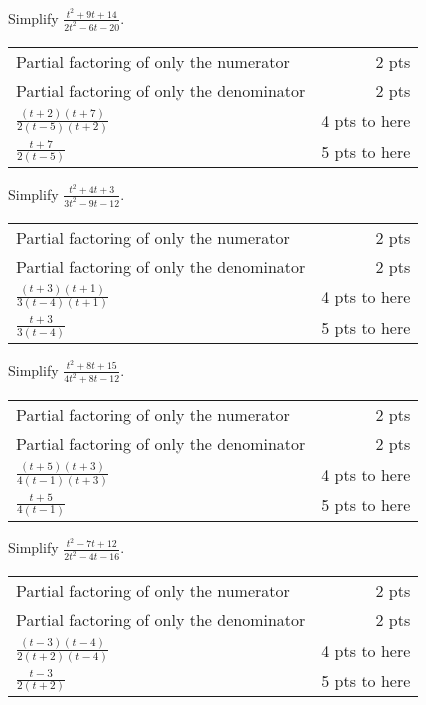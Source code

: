 {
	Simplify $\displaystyle \frac{t^2+9t+14}{2t^2-6t-20}$.
}
{
	\begin{tabular}{l r}
	Partial factoring of only the numerator & 2 pts\\
	Partial factoring of only the denominator & 2 pts\\
	$\displaystyle \frac{(t+2)(t+7)}{2(t-5)(t+2)}$ & 4 pts to here\\[10pt]
	$\displaystyle \frac{t+7}{2(t-5)}$ & 5 pts to here\\
	\end{tabular}
}

{
	Simplify $\displaystyle \frac{t^2+4t+3}{3t^2-9t-12}$.
}
{
	\begin{tabular}{l r}
	Partial factoring of only the numerator & 2 pts\\
	Partial factoring of only the denominator & 2 pts\\
	$\displaystyle \frac{(t+3)(t+1)}{3(t-4)(t+1)}$ & 4 pts to here\\[10pt]
	$\displaystyle \frac{t+3}{3(t-4)}$ & 5 pts to here\\
	\end{tabular}
}

{
	Simplify $\displaystyle \frac{t^2+8t+15}{4t^2+8t-12}$.
}
{
	\begin{tabular}{l r}
	Partial factoring of only the numerator & 2 pts\\
	Partial factoring of only the denominator & 2 pts\\
	$\displaystyle \frac{(t+5)(t+3)}{4(t-1)(t+3)}$ & 4 pts to here\\[10pt]
	$\displaystyle \frac{t+5}{4(t-1)}$ & 5 pts to here\\
	\end{tabular}
}

{
	Simplify $\displaystyle \frac{t^2-7t+12}{2t^2-4t-16}$.
}
{
	\begin{tabular}{l r}
	Partial factoring of only the numerator & 2 pts\\
	Partial factoring of only the denominator & 2 pts\\
	$\displaystyle \frac{(t-3)(t-4)}{2(t+2)(t-4)}$ & 4 pts to here\\[10pt]
	$\displaystyle \frac{t-3}{2(t+2)}$ & 5 pts to here\\
	\end{tabular}
}
